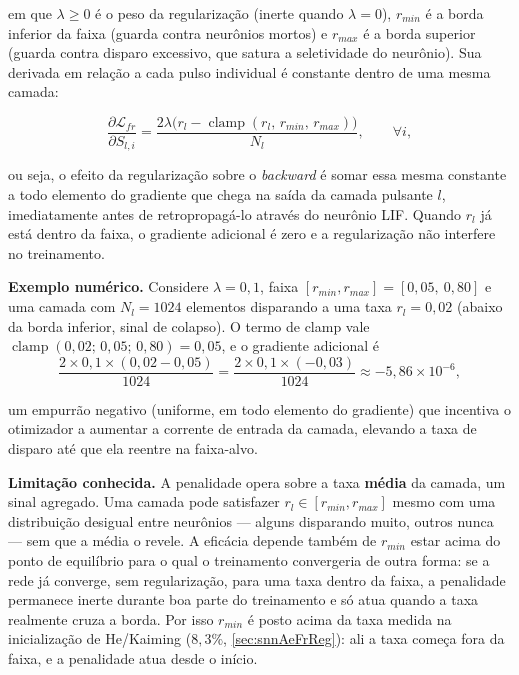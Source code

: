 				\par em que $\lambda \geq 0$ é o peso da regularização (inerte quando $\lambda=0$), $r_{min}$ é a borda inferior da faixa (guarda contra neurônios mortos) e $r_{max}$ é a borda superior (guarda contra disparo excessivo, que satura a seletividade do neurônio). Sua derivada em relação a cada pulso individual é constante dentro de uma mesma camada:

				\begin{equation}
					\label{eq:frreggrad}
					\frac{\partial \mathcal{L}_{fr}}{\partial S_{l,i}} = \frac{2\lambda\big(r_l - \operatorname{clamp}(r_l,\, r_{min},\, r_{max})\big)}{N_l}, \qquad \forall i,
				\end{equation}

				\par ou seja, o efeito da regularização sobre o \textit{backward} é somar essa mesma constante a todo elemento do gradiente que chega na saída da camada pulsante $l$, imediatamente antes de retropropagá-lo através do neurônio LIF. Quando $r_l$ já está dentro da faixa, o gradiente adicional é zero e a regularização não interfere no treinamento.

				\par \textbf{Exemplo numérico.} Considere $\lambda=0{,}1$, faixa $[r_{min}, r_{max}] = [0{,}05,\ 0{,}80]$ e uma camada com $N_l=1024$ elementos disparando a uma taxa $r_l=0{,}02$ (abaixo da borda inferior, sinal de colapso). O termo de clamp vale $\operatorname{clamp}(0{,}02;\,0{,}05;\,0{,}80)=0{,}05$, e o gradiente adicional é
				\begin{equation}
					\frac{2\times0{,}1\times(0{,}02-0{,}05)}{1024} = \frac{2\times0{,}1\times(-0{,}03)}{1024} \approx -5{,}86\times10^{-6},
				\end{equation}
				\par um empurrão negativo (uniforme, em todo elemento do gradiente) que incentiva o otimizador a aumentar a corrente de entrada da camada, elevando a taxa de disparo até que ela reentre na faixa-alvo.

				\par \textbf{Limitação conhecida.} A penalidade opera sobre a taxa \textbf{média} da camada, um sinal agregado. Uma camada pode satisfazer $r_l \in [r_{min}, r_{max}]$ mesmo com uma distribuição desigual entre neurônios --- alguns disparando muito, outros nunca --- sem que a média o revele. A eficácia depende também de $r_{min}$ estar acima do ponto de equilíbrio para o qual o treinamento convergeria de outra forma: se a rede já converge, sem regularização, para uma taxa dentro da faixa, a penalidade permanece inerte durante boa parte do treinamento e só atua quando a taxa realmente cruza a borda. Por isso $r_{min}$ é posto acima da taxa medida na inicialização de He/Kaiming ($8{,}3\%$, \autoref{sec:snnAeFrReg}): ali a taxa começa fora da faixa, e a penalidade atua desde o início.

